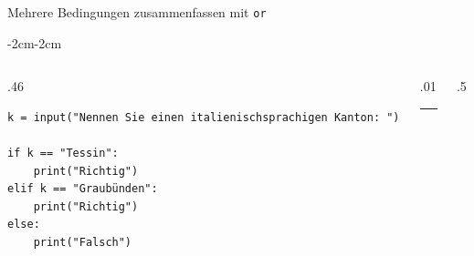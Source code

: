 \begin{frame}[fragile]{Mehrere Bedingungen zusammenfassen mit \lstinline|or|}
    \begin{adjustwidth}{-2cm}{-2cm}
        \begin{columns}
            \begin{column}{.46\pagewidth}
                \begin{lstlisting}[escapechar=!, basicstyle=\footnotesize\ttfamily]
k = input("Nennen Sie einen italienischsprachigen Kanton: ")

if k == "Tessin":
    print("Richtig")
elif k == "Graubünden":
    print("Richtig")
else:
    print("Falsch")
\end{lstlisting}
            \end{column}
            \begin{column}{.01\pagewidth}
                \rule{0.4pt}{\textheight}
            \end{column}
            \begin{column}{.5\pagewidth}
            \end{column}
        \end{columns}
    \end{adjustwidth}
\end{frame}

